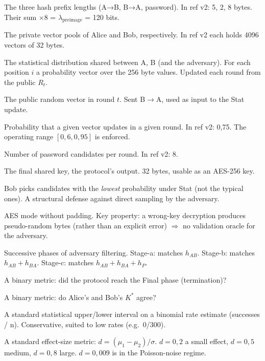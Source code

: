\documentclass[11pt,a4paper]{article}
\begin{document}
\begin{description}[leftmargin=*, style=nextline]
\item[$h_{AB}, h_{BA}, h_P$] The three hash prefix lengths (A→B, B→A, password). In ref v2: 5, 2, 8 bytes. Their sum $\times 8$ = $\lambda_\text{preimage}$ = 120 bits.
\item[$\mathcal{V}_A, \mathcal{V}_B$] The private vector pools of Alice and Bob, respectively. In ref v2 each holds 4096 vectors of 32 bytes.
\item[$\mathcal{S}$ (Stat)] The statistical distribution shared between A, B (and the adversary). For each position $i$ a probability vector over the 256 byte values. Updated each round from the public $R_t$.
\item[$R_t$] The public random vector in round $t$. Sent B$\to$A, used as input to the Stat update.
\item[$p_\text{upd}$] Probability that a given vector updates in a given round. In ref v2: 0{,}75. The operating range $[0{,}6, 0{,}95]$ is enforced.
\item[$M$] Number of password candidates per round. In ref v2: 8.
\item[$K^*$] The final shared key, the protocol's output. 32 bytes, usable as an AES-256 key.
\item[Tail selection / CandMax filter] Bob picks candidates with the \emph{lowest} probability under Stat (not the typical ones). A structural defense against direct sampling by the adversary.
\item[NoPadding (PaddingMode.None)] AES mode without padding. Key property: a wrong-key decryption produces pseudo-random bytes (rather than an explicit error) $\Rightarrow$ no validation oracle for the adversary.
\item[Stage-a / stage-b / stage-c] Successive phases of adversary filtering. Stage-a: matches $h_{AB}$. Stage-b: matches $h_{AB} + h_{BA}$. Stage-c: matches $h_{AB} + h_{BA} + h_P$.
\item[FH (Final-Hit)] A binary metric: did the protocol reach the Final phase (termination)?
\item[KM (Keys-Match)] A binary metric: do Alice's and Bob's $K^*$ agree?
\item[Clopper-Pearson CI] A standard statistical upper/lower interval on a binomial rate estimate (successes / n). Conservative, suited to low rates (e.g.\ 0/300).
\item[Cohen's $d$] A standard effect-size metric: $d = (\mu_1 - \mu_2)/\sigma$. $d = 0{,}2$ a small effect, $d = 0{,}5$ medium, $d = 0{,}8$ large. $d = 0{,}009$ is in the Poisson-noise regime.

\end{description}
\end{document}
